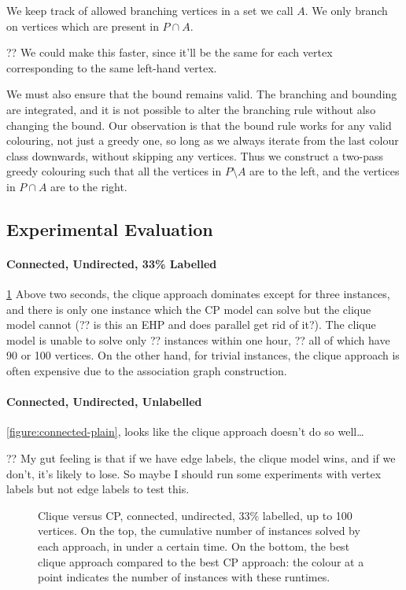 \documentclass{llncs}
\begin{document}
We keep track of allowed branching vertices in a set we call $A$. We only branch on vertices which
are present in $P \cap A$.

?? We could make this faster, since it'll be the same for each vertex corresponding to the same
left-hand vertex.

We must also ensure that the bound remains valid. The branching and bounding are integrated, and it
is not possible to alter the branching rule without also changing the bound. Our observation is that
the bound rule works for any valid colouring, not just a greedy one, so long as we always iterate
from the last colour class downwards, without skipping any vertices. Thus we construct a two-pass
greedy colouring such that all the vertices in $P \setminus A$ are to the left, and the vertices in
$P \cap A$ are to the right.

\cite{DBLP:conf/cp/McCreeshP14}

\subsection{Experimental Evaluation}

\paragraph{Connected, Undirected, 33\% Labelled} \cref{figure:connected-undir33} Above two seconds,
    the clique approach dominates except for three instances, and there is only one instance which
    the CP model can solve but the clique model cannot (?? is this an EHP and does parallel get rid
    of it?). The clique model is unable to solve only ??  instances within one hour, ?? all of which
    have 90 or 100 vertices.  On the other hand, for trivial instances, the clique approach is often
    expensive due to the association graph construction.

\paragraph{Connected, Undirected, Unlabelled} \cref{figure:connected-plain}, looks like the clique
approach doesn't do so well\ldots

?? My gut feeling is that if we have edge labels, the clique model wins, and if we don't, it's
likely to lose. So maybe I should run some experiments with vertex labels but not edge labels to
test this.

\begin{figure}[p]
    \centering
    
    \caption{Clique versus CP, connected, undirected, 33\% labelled, up to 100 vertices. On the top,
        the cumulative number of instances solved by each approach, in under a certain time. On the
        bottom, the best clique approach compared to the best CP approach: the colour at a point
        indicates the number of instances with these runtimes.} \label{figure:connected-undir33}
\end{figure}
\end{document}

